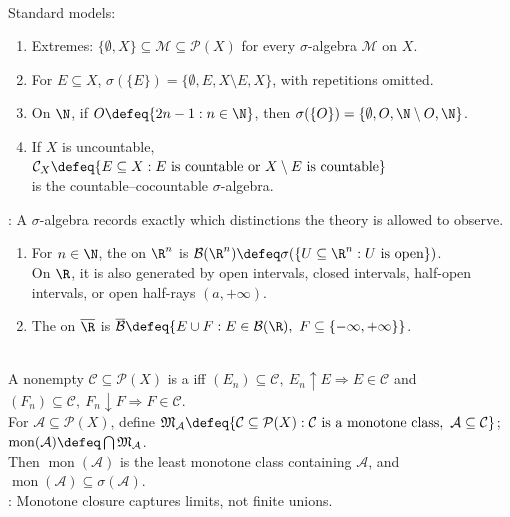 \begin{example} \label{ex:basic-sigma-algebras-and-borel} \\
Standard models:
\begin{enumerate}[label=(\roman*)]
\setlength{\itemsep}{0pt}
\item Extremes: $\{\emptyset,X\}\subseteq\mathcal{M}\subseteq\mathcal{P}(X)$ for every $\sigma$-algebra $\mathcal{M}$ on $X$.
\item For $E\subseteq X$, $\sigma(\{E\})=\{\emptyset,E,X\setminus E,X\}$, with repetitions omitted.
\item On $\N$, if $O\defeq\{2n-1:n\in\N\}$, then $\sigma(\{O\})=\{\emptyset,O,\N\setminus O,\N\}$.
\item If $X$ is uncountable, $\mathcal{C}_X\defeq\{E\subseteq X:E\text{ is countable or }X\setminus E\text{ is countable}\}$\\
is the countable--cocountable $\sigma$-algebra.
\end{enumerate}
: A $\sigma$-algebra records exactly which distinctions the theory is allowed to observe.
\end{example}

\begin{definition} \label{def:borel-and-extended-borel-sigma-algebras} 
\begin{enumerate}[label=(\roman*)]
\setlength{\itemsep}{0pt}
\item For $n\in\N$, the  on $\R^n$ is $\mathcal{B}(\R^n)\defeq\sigma(\{U\subseteq\R^n:U\text{ is open}\})$.\\
On $\R$, it is also generated by open intervals, closed intervals, half-open intervals, or open half-rays $(a,+\infty)$.
\item The  on $\overline{\R}$ is $\overline{\mathcal{B}}\defeq\{E\cup F:E\in\mathcal{B}(\R),\ F\subseteq\{-\infty,+\infty\}\}$.
\end{enumerate}
\end{definition}

\begin{definition} \label{def:monotone-classes} \\
A nonempty $\mathcal{C}\subseteq\mathcal{P}(X)$ is a  iff $(E_n)\subseteq\mathcal{C},\ E_n\uparrow E\Rightarrow E\in\mathcal{C}$ and $(F_n)\subseteq\mathcal{C},\ F_n\downarrow F\Rightarrow F\in\mathcal{C}$.\\
For $\mathcal{A}\subseteq\mathcal{P}(X)$, define $\mathfrak{M}_{\mathcal{A}}\defeq \{\mathcal{C}\subseteq\mathcal{P}(X):\mathcal{C}\text{ is a monotone class},\ \mathcal{A}\subseteq\mathcal{C}\}$; $\operatorname{mon}(\mathcal{A})\defeq\bigcap\mathfrak{M}_{\mathcal{A}}$.\\
Then $\operatorname{mon}(\mathcal{A})$ is the least monotone class containing $\mathcal{A}$, and $\operatorname{mon}(\mathcal{A})\subseteq\sigma(\mathcal{A})$.\\
: Monotone closure captures limits, not finite unions.
\end{definition}

